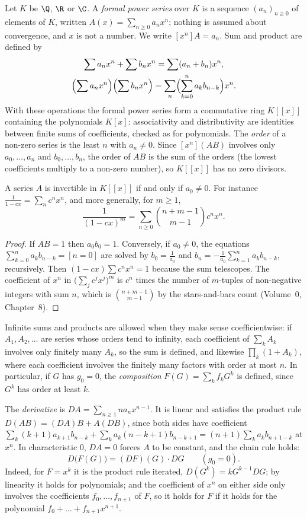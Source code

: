 Let $K$ be $\Q$, $\R$ or $\C$. A \emph{formal power series} over $K$ is a sequence $(a_n)_{n\ge0}$ of elements of $K$,
written $A(x)=\sum_{n\ge0}a_nx^n$; nothing is assumed about convergence, and $x$ is not a number. We write
$[x^n]A=a_n$. Sum and product are defined by
\[
\begin{gathered}\sum a_nx^n+\sum b_nx^n=\sum(a_n+b_n)x^n,\\\Bigl(\sum a_nx^n\Bigr)\Bigl(\sum b_nx^n\Bigr)=\sum_n\Bigl(\sum_{k=0}^na_kb_{n-k}\Bigr)x^n.\end{gathered}
\]
With these operations the formal power series form a commutative ring $K[[x]]$ containing the polynomials $K[x]$:
associativity and distributivity are identities between finite sums of coefficients, checked as for polynomials.
The \emph{order} of a non-zero series is the least $n$ with $a_n\ne0$. Since $[x^n](AB)$ involves only $a_0,\dots,a_n$ and
$b_0,\dots,b_n$, the order of $AB$ is the sum of the orders (the lowest coefficients multiply to a non-zero number), so
$K[[x]]$ has no zero divisors.

\begin{proposition}\label{prop:inverse}
A series $A$ is invertible in $K[[x]]$ if and only if $a_0\ne0$. For instance $\frac1{1-cx}=\sum_nc^nx^n$, and more
generally, for $m\ge1$,
\[
\frac1{(1-cx)^m}=\sum_{n\ge0}\binom{n+m-1}{m-1}c^nx^n.
\]
\end{proposition}
\begin{proof}
If $AB=1$ then $a_0b_0=1$. Conversely, if $a_0\ne0$, the equations $\sum_{k=0}^na_kb_{n-k}=[n=0]$ are solved by
$b_0=\frac1{a_0}$ and $b_n=-\frac1{a_0}\sum_{k=1}^na_kb_{n-k}$, recursively. Then $(1-cx)\sum c^nx^n=1$ because the sum
telescopes. The coefficient of $x^n$ in $\bigl(\sum_jc^jx^j\bigr)^m$ is $c^n$ times the number of $m$-tuples of
non-negative integers with sum $n$, which is $\binom{n+m-1}{m-1}$ by the stars-and-bars count (Volume~0, Chapter~8).
\end{proof}

Infinite sums and products are allowed when they make sense coefficientwise: if $A_1,A_2,\dots$ are series whose
orders tend to infinity, each coefficient of $\sum_kA_k$ involves only finitely many $A_k$, so the sum is defined, and
likewise $\prod_k(1+A_k)$, where each coefficient involves the finitely many factors with order at most $n$. In
particular, if $G$ has $g_0=0$, the \emph{composition} $F(G)=\sum_kf_kG^k$ is defined, since $G^k$ has order at least $k$.

The \emph{derivative} is $DA=\sum_{n\ge1}na_nx^{n-1}$. It is linear and satisfies the product rule $D(AB)=(DA)B+A(DB)$,
since both sides have coefficient $\sum_k(k+1)a_{k+1}b_{n-k}+\sum_ka_k(n-k+1)b_{n-k+1}=(n+1)\sum_ka_kb_{n+1-k}$ at
$x^n$. In characteristic $0$, $DA=0$ forces $A$ to be constant, and the chain rule holds:
\[
D\bigl(F(G)\bigr)=(DF)(G)\cdot DG\qquad(g_0=0).
\]
Indeed, for $F=x^k$ it is the product rule iterated, $D(G^k)=kG^{k-1}DG$; by linearity it holds for polynomials; and the
coefficient of $x^n$ on either side only involves the coefficients $f_0,\dots,f_{n+1}$ of $F$, so it holds for $F$
if it holds for the polynomial $f_0+\dots+f_{n+1}x^{n+1}$.

